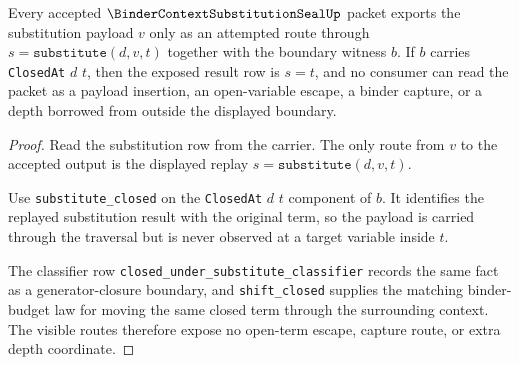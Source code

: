\begin{theorem}
\label{thm:binder-context-substitution-seal-non-escape}
Every accepted $\BinderContextSubstitutionSealUp$ packet exports the substitution payload $v$ only as an attempted route through $s=\texttt{substitute}(d,v,t)$ together with the boundary witness $b$. If $b$ carries \texttt{ClosedAt} $d$ $t$, then the exposed result row is $s=t$, and no consumer can read the packet as a payload insertion, an open-variable escape, a binder capture, or a depth borrowed from outside the displayed boundary.
\end{theorem}
\begin{proof}
Read the substitution row from the carrier. The only route from $v$ to the accepted output is the displayed replay $s=\texttt{substitute}(d,v,t)$.

Use \texttt{substitute\_closed} on the \texttt{ClosedAt} $d$ $t$ component of $b$. It identifies the replayed substitution result with the original term, so the payload is carried through the traversal but is never observed at a target variable inside $t$.

The classifier row \texttt{closed\_under\_substitute\_classifier} records the same fact as a generator-closure boundary, and \texttt{shift\_closed} supplies the matching binder-budget law for moving the same closed term through the surrounding context. The visible routes therefore expose no open-term escape, capture route, or extra depth coordinate.
\end{proof}

